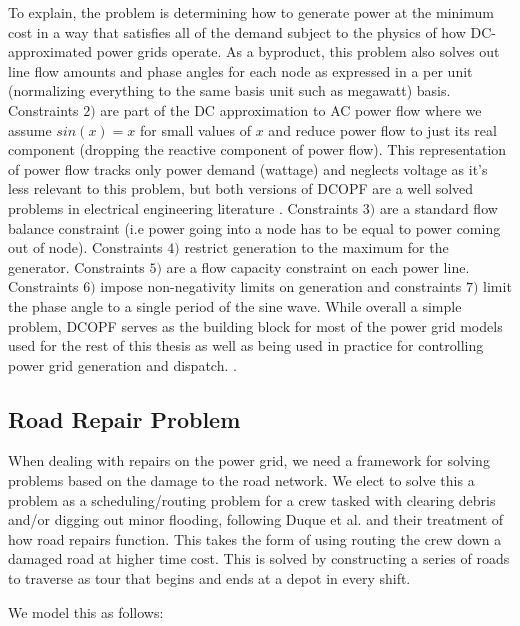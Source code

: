 \documentclass{article}
\begin{document}
To explain, the problem is determining how to generate power at the minimum cost in a way that satisfies all of the demand subject to the physics of how DC-approximated power grids operate. As a byproduct, this problem also solves out line flow amounts and phase angles for each node as expressed in a per unit (normalizing everything to the same basis unit such as megawatt) basis. Constraints $2)$ are part of the DC approximation to AC power flow where we assume $sin(x) = x$ for small values of $x$ and reduce power flow to just its real component (dropping the reactive component of power flow). This representation of power flow tracks only power demand (wattage) and neglects voltage as it's less relevant to this problem, but both versions of DCOPF are a well solved problems in electrical engineering literature \cite{Frank2016} \cite{EldridgeEA2017} \cite{ZhangChow2015}. Constraints $3)$ are a standard flow balance constraint (i.e power going into a node has to be equal to power coming out of node). Constraints $4)$ restrict generation to the maximum for the generator. Constraints $5)$ are a flow capacity constraint on each power line. Constraints $6)$ impose non-negativity limits on generation and constraints $7)$ limit the phase angle to a single period of the sine wave. While overall a simple problem, DCOPF serves as the building block for most of the power grid models used for the rest of this thesis as well as being used in practice for controlling power grid generation and dispatch. \cite{LiBo2007}. 
	
	
	\subsection{Road Repair Problem}
	When dealing with repairs on the power grid, we need a framework for solving problems based on the damage to the road network. We elect to solve this a problem as a scheduling/routing problem for a crew tasked with clearing debris and/or digging out minor flooding, following Duque et al. \cite{DuqueEA2016} and their treatment of how road repairs function. This takes the form of using routing the crew down a damaged road at higher time cost. This is solved by constructing a series of roads to traverse as tour that begins and ends at a depot in every shift.
	
	We model this as follows:
	
\end{document}
